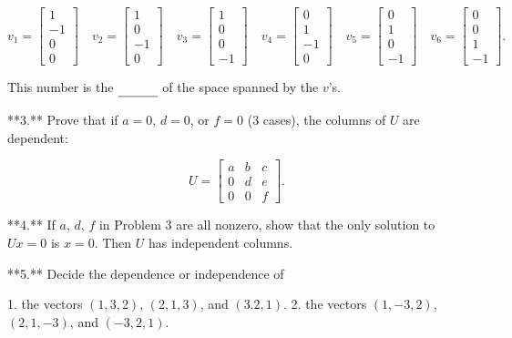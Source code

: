 \[v_{1}=\begin{bmatrix}1\\ -1\\ 0\\ 0\end{bmatrix}\quad v_{2}=\begin{bmatrix}1\\ 0\\ -1\\ 0\end{bmatrix}\quad v_{3}=\begin{bmatrix}1\\ 0\\ 0\\ -1\end{bmatrix}\quad v_{4}=\begin{bmatrix}0\\ 1\\ -1\\ 0\end{bmatrix}\quad v_{5}=\begin{bmatrix}0\\ 1\\ 0\\ -1\end{bmatrix}\quad v_{6}=\begin{bmatrix}0\\ 0\\ 1\\ -1\end{bmatrix}.\]

This number is the \(\underline{\phantom{\text{\rm(\ref{eq:1})}}}\) of the space spanned by the \(v\)'s.

**3.** Prove that if \(a=0\), \(d=0\), or \(f=0\) (3 cases), the columns of \(U\) are dependent:

\[U=\begin{bmatrix}a&b&c\\ 0&d&e\\ 0&0&f\end{bmatrix}.\]

**4.** If \(a\), \(d\), \(f\) in Problem 3 are all nonzero, show that the only solution to \(Ux=0\) is \(x=0\). Then \(U\) has independent columns.

**5.** Decide the dependence or independence of

1. the vectors \((1,3,2)\), \((2,1,3)\), and \((3.2,1)\).
2. the vectors \((1,-3,2)\), \((2,1,-3)\), and \((-3,2,1)\).

 